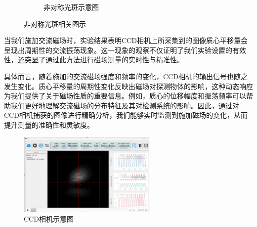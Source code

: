 \documentclass[12pt]{ctexart}
\numberwithin{equation}{section} %
\begin{document}
\begin{figure}[H]
\begin{subfigure}{0.3\textwidth}
        \caption{非对称光斑示意图} %
        \label{fig:非对称光斑示意图} %
    \end{subfigure}
    \caption{非对称光斑相关图示} %
    \label{fig:非对称光斑总图} %
\end{figure}


当我们施加交流磁场时，实验结果表明CCD相机上所采集到的图像质心平移量会呈现出周期性的交流振荡现象。这一现象的观察不仅证明了我们实验设置的有效性，还突显了通过此方法进行磁场测量的实时性与精准性。

具体而言，随着施加的交流磁场强度和频率的变化，CCD相机的输出信号也随之发生变化。质心平移量的周期性变化反映出磁场对探测物体的影响，这种动态响应为我们提供了关于磁场性质的重要信息。例如，质心的位移幅度和振荡频率可以帮助我们更好地理解交流磁场的分布特征及其对检测系统的影响。因此，通过对CCD相机捕获的图像进行精确分析，我们能够实时监测到施加磁场的变化，从而提升测量的准确性和灵敏度。
\begin{figure}[H]
    \centering
    \includegraphics[width=0.6\textwidth]{交流信号图.png} %
    \caption{CCD相机示意图} %
\end{figure}
\end{document}
